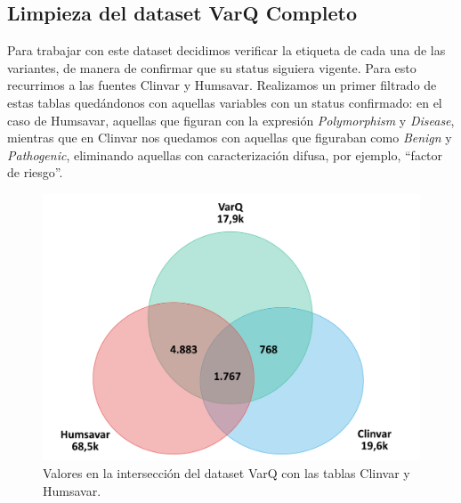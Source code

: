 \subsection{Limpieza del dataset VarQ Completo}

Para trabajar con este dataset decidimos verificar la etiqueta de cada una de las variantes, de manera de confirmar que su status siguiera vigente. Para esto recurrimos a las fuentes Clinvar y Humsavar. Realizamos un primer filtrado de estas tablas quedándonos con aquellas variables con un status confirmado: en el caso de Humsavar, aquellas que figuran con la expresión \textit{Polymorphism} y \textit{Disease}, mientras que en Clinvar nos quedamos con aquellas que figuraban como \textit{Benign} y \textit{Pathogenic}, eliminando aquellas con caracterización difusa, por ejemplo, ``factor de riesgo''. 

\begin{figure}[H]
    \centering
    \includegraphics[scale=0.4]{documents/latex/figures/3/interseccion_varq.pdf}
    \caption{Valores en la intersección del dataset VarQ con las tablas Clinvar y Humsavar.}
    \label{fig:interseccion_varq}
\end{figure}

